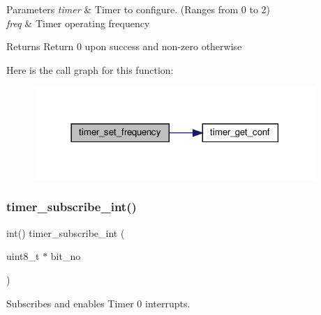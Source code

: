 \begin{DoxyParams}{Parameters}
{\em timer} & Timer to configure. (Ranges from 0 to 2) \\
\hline
{\em freq} & Timer operating frequency \\
\hline
\end{DoxyParams}
\begin{DoxyReturn}{Returns}
Return 0 upon success and non-\/zero otherwise 
\end{DoxyReturn}
Here is the call graph for this function\+:
\nopagebreak
\begin{figure}[H]
\begin{center}
\leavevmode
\includegraphics[width=302pt]{group__timer_gaf2c04fa8e97ffa748fd3f612886a92a7_cgraph}
\end{center}
\end{figure}
\mbox{\label{group__timer_gac57a7e1140a7e00ad95ac5488d2a671b}} 
\subsubsection{\texorpdfstring{timer\+\_\+subscribe\+\_\+int()}{timer\_subscribe\_int()}}
{\footnotesize\ttfamily int() timer\+\_\+subscribe\+\_\+int (\begin{DoxyParamCaption}\item[{uint8\+\_\+t $\ast$}]{bit\+\_\+no }\end{DoxyParamCaption})}



Subscribes and enables Timer 0 interrupts. 


